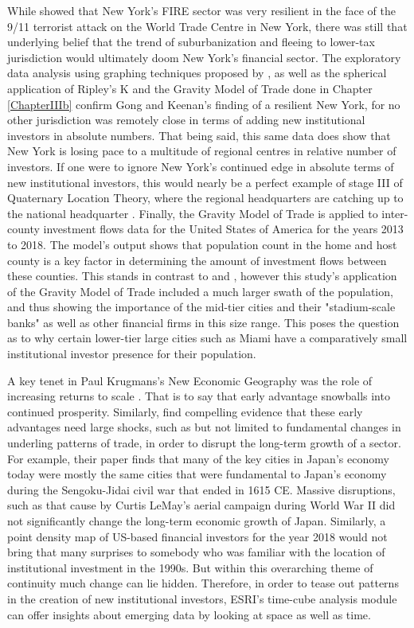 While \cite{gongthe2012} showed that New York's FIRE sector was very resilient in the face of the 9/11 terrorist attack on the World Trade Centre in New York, there was still that underlying belief that the trend of suburbanization and fleeing to lower-tax jurisdiction would ultimately doom New York's financial sector.  The exploratory data analysis using graphing techniques proposed by  \cite{tufte1998visual}, as well as the spherical application of Ripley's K and the Gravity Model of Trade done in Chapter \ref{ChapterIIIb} confirm Gong and Keenan's finding of a resilient New York, for no other jurisdiction was remotely close in terms of adding new institutional investors in absolute numbers.  That being said, this same data does show that New York is losing pace to a multitude of regional centres in relative number of investors.  If one were to ignore New York's continued edge in absolute terms of new institutional investors, this would nearly be a perfect example of stage III of Quaternary Location Theory, where the regional headquarters are catching up to the national headquarter \citep{Semple_Phipps82}.  Finally, the Gravity Model of Trade is applied to inter-county investment flows data for the United States of America for the years 2013 to 2018.  The model's output shows that population count in the home and host county is a key factor in determining the amount of investment flows between these counties.  This stands in contrast to \cite{greena1993} and \cite{GreenOLef2014}, however this study's application of the Gravity Model of Trade included a much larger swath of the population, and thus showing the importance of the mid-tier cities and their "stadium-scale banks" as well as other financial firms in this size range. This poses the question as to why certain lower-tier large cities such as Miami have a comparatively small institutional investor presence for their population.  

A key tenet in Paul Krugmans's New Economic Geography was the role of increasing returns to scale \citep{krugman1991increasing}.  That is to say that early advantage snowballs into continued prosperity.  Similarly, \cite{davis2002bones} find compelling evidence that these early advantages need large shocks, such as but not limited to fundamental changes in underling patterns of trade, in order to disrupt the long-term growth of a sector.  For example, their paper finds that many of the key cities in Japan's economy today were mostly the same cities that were fundamental to Japan's economy during the Sengoku-Jidai civil war that ended in 1615 CE.  Massive disruptions, such as that cause by Curtis LeMay's aerial campaign during World War II did not significantly change the long-term economic growth of Japan.  Similarly, a point density map of US-based financial investors for the year 2018 would not bring that many surprises to somebody who was familiar with the location of institutional investment in the 1990s.  But within this overarching theme of continuity much change can lie hidden.  Therefore, in order to tease out patterns in the creation of new institutional investors, ESRI's time-cube analysis module can offer insights about emerging data by looking at space as well as time. 

